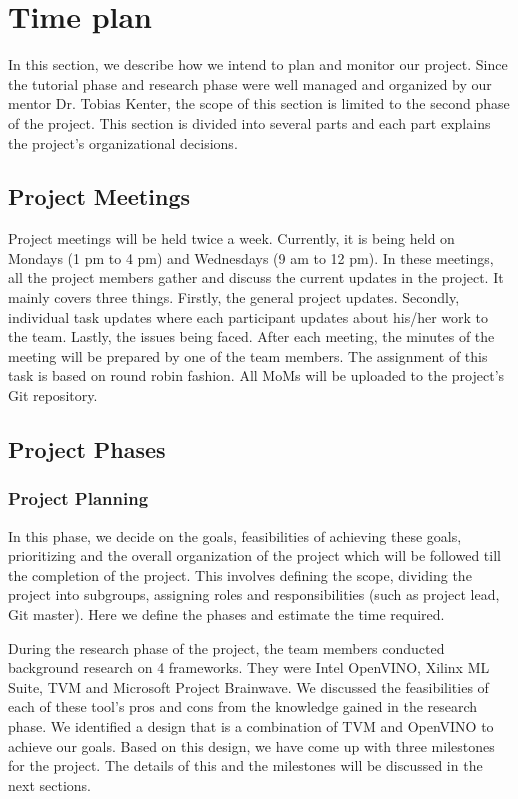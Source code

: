 \documentclass[titlepage]{report}
\begin{document}

\chapter{Time plan}
In this section, we describe how we intend to plan and monitor our project. Since the tutorial phase and research phase were well managed and organized by our mentor Dr. Tobias Kenter, the scope of this section is limited to the second phase of the project. This section is divided into several parts and each part explains the project’s organizational decisions. 

\section{Project Meetings}
Project meetings will be held twice a week. Currently, it is being held on Mondays (1 pm to 4 pm) and Wednesdays (9 am to 12 pm). In these meetings, all the project members gather and discuss the current updates in the project. It mainly covers three things. Firstly, the general project updates. Secondly, individual task updates where each participant updates about his/her work to the team. Lastly, the issues being faced. After each meeting, the minutes of the meeting will be prepared by one of the team members. The assignment of this task is based on round robin fashion. All MoMs will be uploaded to the project’s Git repository.


\section{Project Phases}
\subsection{Project Planning}
In this phase, we decide on the goals, feasibilities of achieving these goals, prioritizing and the overall organization of the project which will be followed till the completion of the project. This involves defining the scope, dividing the project into subgroups, assigning roles and responsibilities (such as project lead, Git master). Here we define the phases and estimate the time required. 

During the research phase of the project, the team members conducted background research on 4 frameworks. They were Intel OpenVINO, Xilinx ML Suite, TVM and Microsoft Project Brainwave. We discussed the feasibilities of each of these tool's pros and cons from the knowledge gained in the research phase. We identified a design that is a combination of TVM and OpenVINO to achieve our goals. Based on this design, we have come up with three milestones for the project. The details of this and the milestones will be discussed in the next sections.
\end{document}
